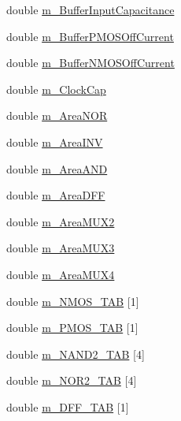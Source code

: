 \begin{DoxyCompactItemize}
\item 
double \hyperlink{classTechParameter_ad58a1e762156265e1c54da2023f73659}{m\_\-BufferInputCapacitance}
\item 
double \hyperlink{classTechParameter_a678a8f1f30cf2a0fffa189eb383709a9}{m\_\-BufferPMOSOffCurrent}
\item 
double \hyperlink{classTechParameter_a64d128b4791a8c98c2c8f8966ab85d93}{m\_\-BufferNMOSOffCurrent}
\item 
double \hyperlink{classTechParameter_afe85cc6f3cefa9369aeac5f9d5c75d0a}{m\_\-ClockCap}
\item 
double \hyperlink{classTechParameter_adaac971c7899d9deca9de07c80ca4862}{m\_\-AreaNOR}
\item 
double \hyperlink{classTechParameter_abd9f2f05e80e08ffd0d61f50b5aeed16}{m\_\-AreaINV}
\item 
double \hyperlink{classTechParameter_ac470c79231da28f10eab4b1dd6941507}{m\_\-AreaAND}
\item 
double \hyperlink{classTechParameter_a0b18a64b067505ac244113d2dc75a4a1}{m\_\-AreaDFF}
\item 
double \hyperlink{classTechParameter_a6b2f7f31aa155d3809fe0846a9eb1354}{m\_\-AreaMUX2}
\item 
double \hyperlink{classTechParameter_a8243fb612e65f25c09a25e593d4bed40}{m\_\-AreaMUX3}
\item 
double \hyperlink{classTechParameter_af66c1157f2c860fd6918f071e05f6203}{m\_\-AreaMUX4}
\item 
double \hyperlink{classTechParameter_ac98821e69770c0368b636d7658c00dde}{m\_\-NMOS\_\-TAB} \mbox{[}1\mbox{]}
\item 
double \hyperlink{classTechParameter_aa5e3cffbdcd4baca8eabf360e81dfa08}{m\_\-PMOS\_\-TAB} \mbox{[}1\mbox{]}
\item 
double \hyperlink{classTechParameter_a8b497e77e3b2eea5cbba78f44b094d3b}{m\_\-NAND2\_\-TAB} \mbox{[}4\mbox{]}
\item 
double \hyperlink{classTechParameter_a9b651b3730ac487f84f6017eb9a591c3}{m\_\-NOR2\_\-TAB} \mbox{[}4\mbox{]}
\item 
double \hyperlink{classTechParameter_a49ea60c5430dec7b1a94a56c44aa1e7c}{m\_\-DFF\_\-TAB} \mbox{[}1\mbox{]}
\end{DoxyCompactItemize}


